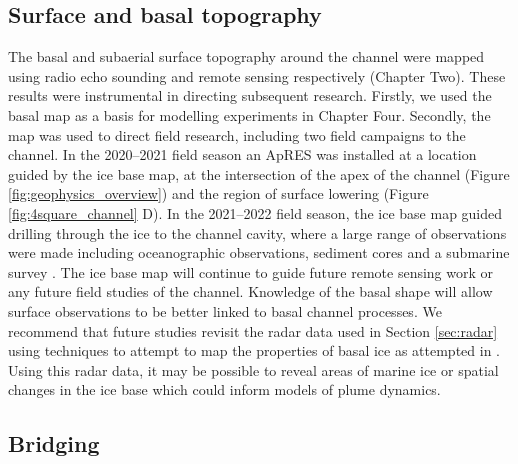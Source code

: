 \subsection{Surface and basal topography}

The basal and subaerial surface topography around the channel were mapped using radio echo sounding and remote sensing respectively (Chapter Two).  
These results were instrumental in directing subsequent research. Firstly, we used the basal map as a basis for modelling experiments in Chapter Four. Secondly, the map was used to direct field research, including two field campaigns to the channel. In the 2020--2021 field season an ApRES was installed at a location guided by the ice base map, at the intersection of the apex of the channel (Figure \ref{fig:geophysics_overview}) and the region of surface lowering (Figure \ref{fig:4square_channel} D). In the 2021--2022 field season, the ice base map guided drilling through the ice to the channel cavity, where a large range of observations were made including oceanographic observations, sediment cores and a submarine survey \citep{horgan2022channel}. The ice base map will continue to guide future remote sensing work or any future field studies of the channel. Knowledge of the basal shape will allow surface observations to be better linked to basal channel processes. 
We recommend that future studies revisit the radar data used in Section \ref{sec:radar} using techniques to attempt to map the properties of basal ice as attempted in \cite{macgregor2011grounding}. Using this radar data, it may be possible to reveal areas of marine ice or spatial changes in the ice base which could inform models of plume dynamics.

\subsection{Bridging}

